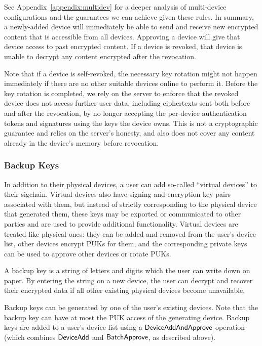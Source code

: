 See Appendix~\ref{appendix:multidev} for a deeper analysis of multi-device configurations and the
guarantees we can achieve given these rules. In summary, a newly-added device will immediately be
able to send and receive new encrypted content that is accessible from all devices. Approving a
device will give that device access to past encrypted content. If a device is revoked, that device
is unable to decrypt any content encrypted after the revocation.

Note that if a device is self-revoked, the necessary key rotation might not happen immediately if
there are no other suitable devices online to perform it. Before the key rotation is completed, we
rely on the server to enforce that the revoked device does not access further user data, including
ciphertexts sent both before and after the revocation, by no longer accepting the per-device
authentication tokens and signatures using the keys the device owns. This is not a cryptographic
guarantee and relies on the server's honesty, and also does not cover any content already in the
device's memory before revocation.

\subsubsection{Backup Keys}
\label{subsubsec:backupkeys}

In addition to their physical devices, a user can add so-called ``virtual devices'' to their
sigchain. Virtual devices also have signing and encryption key pairs associated with them, but
instead of strictly corresponding to the physical device that generated them, these keys may be
exported or communicated to other parties and are used to provide additional functionality. Virtual
devices are treated like physical ones: they can be added and removed from the user's device list,
other devices encrypt PUKs for them, and the corresponding private keys can be used to approve other
devices or rotate PUKs.  

A backup key is a string of letters and digits which the user can write down on paper. By entering
the string on a new device, the user can decrypt and recover their encrypted data if all other
existing physical devices become unavailable.

Backup keys can be generated by one of the user's existing devices. Note that the backup key can
have at most the PUK access of the generating device. Backup keys are added to a user's device list
using a $\mathsf{DeviceAddAndApprove}{}$ operation (which combines $\mathsf{DeviceAdd}{}$ and $\mathsf{BatchApprove}{}$, as
described above).

